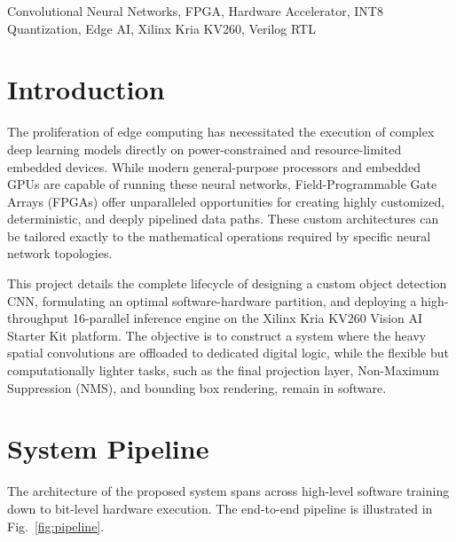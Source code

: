 \documentclass[conference]{IEEEtran}
\begin{document}
\begin{IEEEkeywords}
Convolutional Neural Networks, FPGA, Hardware Accelerator, INT8 Quantization, Edge AI, Xilinx Kria KV260, Verilog RTL
\end{IEEEkeywords}

\section{Introduction}
The proliferation of edge computing has necessitated the execution of complex deep learning models directly on power-constrained and resource-limited embedded devices. While modern general-purpose processors and embedded GPUs are capable of running these neural networks, Field-Programmable Gate Arrays (FPGAs) offer unparalleled opportunities for creating highly customized, deterministic, and deeply pipelined data paths. These custom architectures can be tailored exactly to the mathematical operations required by specific neural network topologies.

This project details the complete lifecycle of designing a custom object detection CNN, formulating an optimal software-hardware partition, and deploying a high-throughput 16-parallel inference engine on the Xilinx Kria KV260 Vision AI Starter Kit platform. The objective is to construct a system where the heavy spatial convolutions are offloaded to dedicated digital logic, while the flexible but computationally lighter tasks, such as the final projection layer, Non-Maximum Suppression (NMS), and bounding box rendering, remain in software.

\section{System Pipeline}

The architecture of the proposed system spans across high-level software training down to bit-level hardware execution. The end-to-end pipeline is illustrated in Fig.~\ref{fig:pipeline}.
\end{document}
